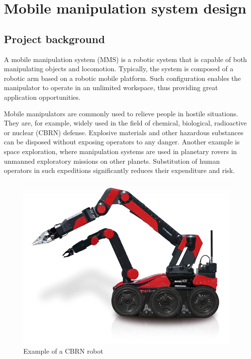 \chapter{Mobile manipulation system design}
\label{cha:mmsdesign}


\section{Project background}
\label{sec:background}

A mobile manipulation system (MMS) is a robotic system that is capable of both manipulating objects and locomotion. Typically, the system is composed of a robotic arm based on a robotic mobile platform. Such configuration enables the manipulator to operate in an unlimited workspace, thus providing great application opportunities.

Mobile manipulators are commonly used to relieve people in hostile situations. They are, for example, widely used in the field of chemical, biological, radioactive or nuclear (CBRN) defense. Explosive materials and other hazardous substances can be disposed without exposing operators to any danger. Another example is space exploration, where manipulation systems are used in planetary rovers in unmanned exploratory missions on other planets. Substitution of human operators in such expeditions significantly reduces their expenditure and risk.

\begin{figure}[H]
\centering
\includegraphics[totalheight=0.3\textheight]{fig/aunav}
\caption{Example of a CBRN robot \cite{aunav}}
\label{fig:aunav}
\end{figure}

